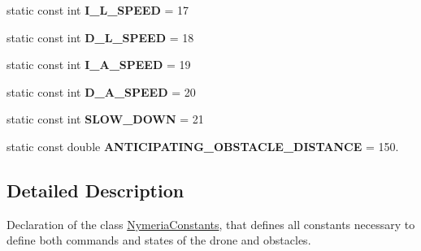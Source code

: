 \begin{DoxyCompactItemize}
\item 
\hypertarget{classNymeriaConstants_a2c0e8ae1830204cfa24ab86864f35527}{static const int {\bfseries \-I\-\_\-\-L\-\_\-\-S\-P\-E\-E\-D} = 17}\label{classNymeriaConstants_a2c0e8ae1830204cfa24ab86864f35527}

\item 
\hypertarget{classNymeriaConstants_a496b941c8154550cf4633f0dc60ca941}{static const int {\bfseries \-D\-\_\-\-L\-\_\-\-S\-P\-E\-E\-D} = 18}\label{classNymeriaConstants_a496b941c8154550cf4633f0dc60ca941}

\item 
\hypertarget{classNymeriaConstants_ae208027ae08534d0d2b00c55153a543b}{static const int {\bfseries \-I\-\_\-\-A\-\_\-\-S\-P\-E\-E\-D} = 19}\label{classNymeriaConstants_ae208027ae08534d0d2b00c55153a543b}

\item 
\hypertarget{classNymeriaConstants_a962d705f0f1680269a44d4e3071ec959}{static const int {\bfseries \-D\-\_\-\-A\-\_\-\-S\-P\-E\-E\-D} = 20}\label{classNymeriaConstants_a962d705f0f1680269a44d4e3071ec959}

\item 
\hypertarget{classNymeriaConstants_a9267d534465088daaddeb0a22933cd6e}{static const int {\bfseries \-S\-L\-O\-W\-\_\-\-D\-O\-W\-N} = 21}\label{classNymeriaConstants_a9267d534465088daaddeb0a22933cd6e}

\item 
\hypertarget{classNymeriaConstants_ae0b8219327ad27129ed6c97a26ec27c2}{static const double {\bfseries \-A\-N\-T\-I\-C\-I\-P\-A\-T\-I\-N\-G\-\_\-\-O\-B\-S\-T\-A\-C\-L\-E\-\_\-\-D\-I\-S\-T\-A\-N\-C\-E} = 150.}\label{classNymeriaConstants_ae0b8219327ad27129ed6c97a26ec27c2}

\end{DoxyCompactItemize}


\subsection{\-Detailed \-Description}
\-Declaration of the class \hyperlink{classNymeriaConstants}{\-Nymeria\-Constants}, that defines all constants necessary to define both commands and states of the drone and obstacles. 

